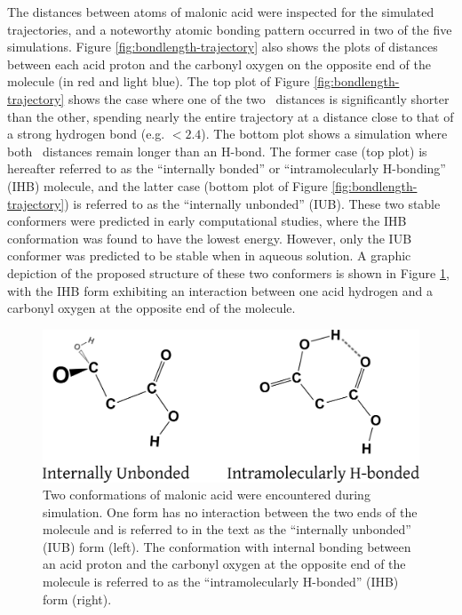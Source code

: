 The distances between atoms of malonic acid were inspected for the simulated trajectories, and a noteworthy atomic bonding pattern occurred in two of the five simulations. Figure \ref{fig:bondlength-trajectory} also shows the plots of distances between each acid proton and the carbonyl oxygen on the opposite end of the molecule (in red and light blue). The top plot of Figure \ref{fig:bondlength-trajectory} shows the case where one of the two \ocarbh~distances is significantly shorter than the other, spending nearly the entire trajectory at a distance close to that of a strong hydrogen bond (e.g. $< 2.4$\angs). The bottom plot shows a simulation where both \ocarbh~distances remain longer than an H-bond. The former case (top plot) is hereafter referred to as the ``internally bonded'' or ``intramolecularly H-bonding'' (IHB) molecule, and the latter case (bottom plot of Figure \ref{fig:bondlength-trajectory}) is referred to as the ``internally unbonded'' (IUB). These two stable conformers were predicted in early computational studies, where the IHB conformation was found to have the lowest energy.\cite{Nguyen2005,Macoas2000a,Tarakeshwar1996} However, only the IUB conformer was predicted to be stable when in aqueous solution. A graphic depiction of the proposed structure of these two conformers is shown in Figure \ref{fig:structure}, with the IHB form exhibiting an interaction between one acid hydrogen and a carbonyl oxygen at the opposite end of the molecule. 


\begin{figure}[h!]
	\begin{center}
		\includegraphics[scale=1.0]{images/bond-length/structure.png}
		\caption{Two conformations of malonic acid were encountered during simulation. One form has no interaction between the two ends of the molecule and is referred to in the text as the ``internally unbonded'' (IUB) form (left). The conformation with internal bonding between an acid proton and the carbonyl oxygen at the opposite end of the molecule is referred to as the ``intramolecularly H-bonded'' (IHB) form (right).}
		\label{fig:structure}
	\end{center}
\end{figure}


